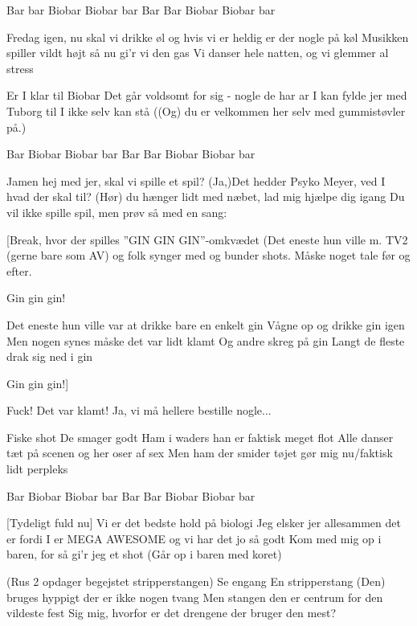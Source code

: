 \documentclass[a4paper,11pt]{article}
\begin{document}
\begin{song}
   Bar bar Biobar Biobar bar
  Bar Bar Biobar Biobar bar

   Fredag igen, nu skal vi drikke øl
   og hvis vi er heldig er der nogle på køl
   Musikken spiller vildt højt så nu gi'r vi den gas
   Vi danser hele natten, og vi glemmer al stress

   Er I klar
  til Biobar
  Det går voldsomt for sig - nogle de har ar
  I kan fylde jer med Tuborg til I ikke selv kan stå
  ((Og) du er velkommen her selv med gummistøvler på.)
  
   Bar Biobar Biobar bar
  Bar Bar Biobar Biobar bar
  
   Jamen hej med jer, skal vi spille et spil?
  (Ja,)Det hedder Psyko Meyer, ved I hvad der skal til?
  (Hør) du hænger lidt med næbet, lad mig hjælpe dig igang
  Du vil ikke spille spil, men prøv så med en sang:

  [Break, hvor der spilles ”GIN GIN GIN”-omkvædet (Det eneste hun ville m. TV2 (gerne bare som AV) og folk synger med og bunder shots. Måske noget tale før og efter.
 
 Gin gin gin! 
 
 Det eneste hun ville var at drikke bare en enkelt gin
 Vågne op og drikke gin igen
 Men nogen synes måske det var lidt klamt
 Og andre skreg på gin
 Langt de fleste drak sig ned i gin
 
 Gin gin gin!]
  
   Fuck! Det var klamt!
   Ja, vi må hellere bestille nogle...
  
   Fiske shot
  De smager godt
  Ham i waders han er faktisk meget flot
  Alle danser tæt på scenen og her oser af sex
  Men ham der smider tøjet gør mig nu/faktisk lidt perpleks
  
   Bar Biobar Biobar bar
  Bar Bar Biobar Biobar bar
  
  [Tydeligt fuld nu]
   Vi er det bedste hold på biologi
  Jeg elsker jer allesammen det er fordi
    I er MEGA AWESOME og vi har det jo så godt
    Kom med mig op i baren, for så gi'r jeg et shot (Går op i baren med koret)
    
    (Rus 2 opdager begejstet stripperstangen)
  Se engang
    En stripperstang    
   (Den) bruges hyppigt der er ikke nogen tvang
  Men stangen den er centrum for den vildeste fest
   Sig mig, hvorfor er det drengene der bruger den mest?


\end{song}
\end{document}
